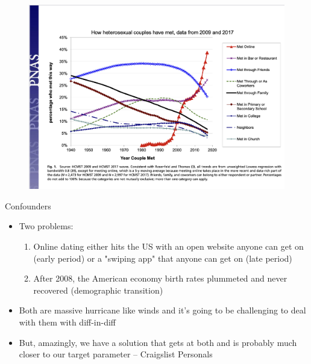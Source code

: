 \documentclass{beamer}
\begin{document}
\begin{frame}

\begin{figure}
    \centering
    \includegraphics[height=0.85\textheight]{./lecture_includes/online_dating}
\end{figure}

\end{frame}

\begin{frame}{Confounders}

\begin{itemize}

\item Two problems:
	\begin{enumerate}
	\item Online dating either hits the US with an open website anyone can get on (early period) or a "swiping app" that anyone can get on (late period)
	\item After 2008, the American economy birth rates plummeted and never recovered (demographic transition)
	\end{enumerate}
\item Both are massive hurricane like winds and it's going to be challenging to deal with them with diff-in-diff
\item But, amazingly, we have a solution that gets at both and is probably much closer to our target parameter -- Craigslist Personals

\end{itemize}

\end{frame}
\end{document}
